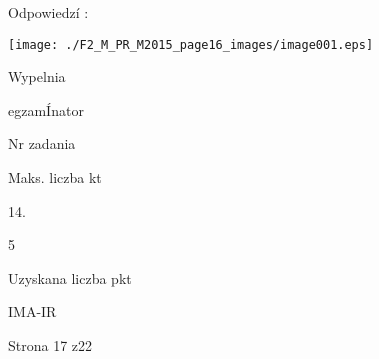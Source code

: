 \documentclass[a4paper,12pt]{article}
\begin{document}
Odpowiedzí :
\begin{center}
\texttt{[image: ./F2\_M\_PR\_M2015\_page16\_images/image001.eps]}
\end{center}
Wypelnia

egzamÍnator

Nr zadania

Maks. liczba kt

14.

5

Uzyskana liczba pkt

IMA-IR

Strona 17 z22
\end{document}
